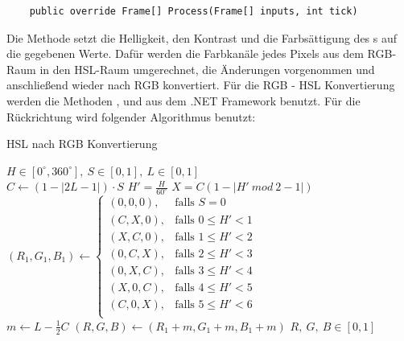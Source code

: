 \begin{itemize}
	\begin{verbatim}
	public override Frame[] Process(Frame[] inputs, int tick)
	\end{verbatim}
	Die Methode  setzt die Helligkeit, den Kontrast und die Farbsättigung des s auf die gegebenen Werte. Dafür werden die Farbkanäle jedes Pixels aus dem RGB-Raum in den HSL-Raum umgerechnet, die Änderungen vorgenommen und anschließend wieder nach RGB konvertiert. Für die RGB - HSL Konvertierung werden die Methoden ,  und  aus dem .NET Framework benutzt. Für die Rückrichtung wird folgender Algorithmus benutzt:
	\begin{algorithm}[H]
	\caption{HSL nach RGB Konvertierung}
		\begin{algorithmic}[1]
			\REQUIRE $ H \in [0^\circ, 360^\circ], \ S \in [0, 1], \ L \in [0, 1] $ \\
			\vspace{3px}
			\STATE $ C \gets (1 - |2L - 1|) \cdot S $
			\STATE $ H' = \frac{H}{60^\circ} $
			\STATE $ X = C(1 - |H' \ mod \ 2 - 1|) $
			\vspace{3px}
			\STATE $ (R_1, G_1, B_1) \gets
					\begin{cases} 
						(0, 0, 0), & \text{falls } S = 0 \\
						(C, X, 0), & \text{falls } 0 \leq H' < 1 \\
						(X, C, 0), & \text{falls } 1 \leq H' < 2 \\
						(0, C, X), & \text{falls } 2 \leq H' < 3 \\
						(0, X, C), & \text{falls } 3 \leq H' < 4 \\
						(X, 0, C), & \text{falls } 4 \leq H' < 5 \\
						(C, 0, X), & \text{falls } 5 \leq H' < 6 \\
					\end{cases}
				   $
			\vspace{3px} \\
			\vspace{3px}
			\STATE $ m \gets L - \frac{1}{2}C $
			\STATE $ (R, G, B) \gets (R_1 + m, G_1 + m, B_1 + m) $
			\vspace{3px}
			\ENSURE $ R, \ G, \ B \in [0, 1] $ \\
		\end{algorithmic}
	\end{algorithm}
	

\end{itemize}
